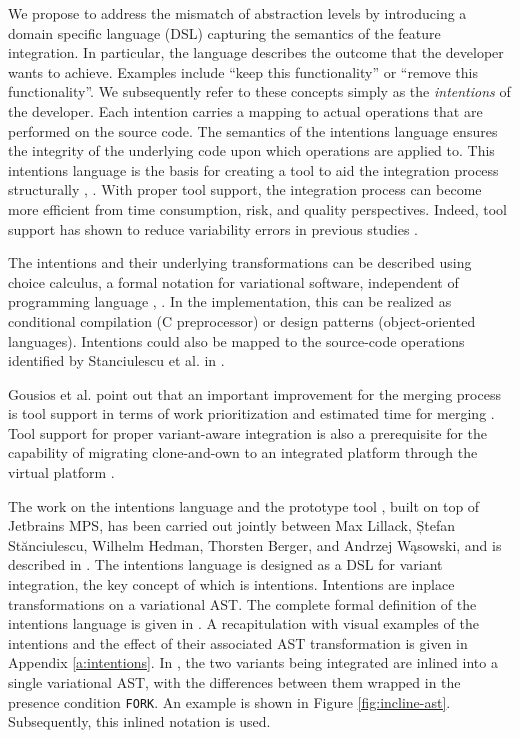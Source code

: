 We propose to address the mismatch of abstraction levels by introducing a domain specific language (DSL) capturing the semantics of the feature integration. In particular, the language describes the outcome that the developer wants to achieve. Examples include ``keep this functionality'' or ``remove this functionality''. We subsequently refer to these concepts simply as the \textit{intentions} of the developer. Each intention carries a mapping to actual operations that are performed on the source code. The semantics of the intentions language ensures the integrity of the underlying code upon which operations are applied to. This intentions language is the basis for creating a tool to aid the integration process structurally \cite{mens2002}, \cite{apel2011}. With proper tool support, the integration process can become more efficient from time consumption, risk, and quality perspectives. Indeed, tool support has shown to reduce variability errors in previous studies \cite{ribeiro2014emergent}.

The intentions and their underlying transformations can be described using choice calculus, a formal notation for variational software, independent of programming language \cite{erwig2011choice}, \cite{walkingshaw2012choice}. In the implementation, this can be realized as conditional compilation (C preprocessor) or design patterns (object-oriented languages). Intentions could also be mapped to the source-code operations identified by Stanciulescu et al. in \cite{stanciulescu2016concepts}.

Gousios et al. point out that an important improvement for the merging process is tool support in terms of work prioritization and estimated time for merging \cite{gousios2015}. Tool support for proper variant-aware integration is also a prerequisite for the capability of migrating clone-and-own to an integrated platform through the virtual platform \cite{antkiewicz2014flexible}.

The work on the intentions language and the prototype tool \tooln, built on top of Jetbrains MPS, has been carried out jointly between Max Lillack, Ștefan St\u{a}nciulescu, Wilhelm Hedman, Thorsten Berger, and Andrzej W\k{a}sowski, and is described in \cite{lillack2017intentions}. The intentions language is designed as a DSL for variant integration, the key concept of which is intentions. Intentions are inplace transformations on a variational AST. The complete formal definition of the intentions language is given in \cite{lillack2017intentions}. A recapitulation with visual examples of the intentions and the effect of their associated AST transformation is given in Appendix \ref{a:intentions}. In \tooln, the two variants being integrated are inlined into a single variational AST, with the differences between them wrapped in the presence condition \texttt{FORK}. An example is shown in Figure \ref{fig:incline-ast}. Subsequently, this inlined notation is used.


